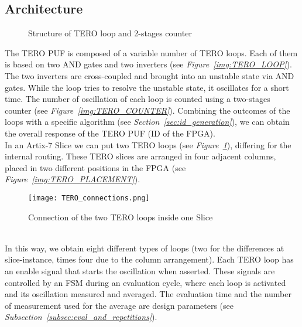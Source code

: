 \subsection{Architecture}
\begin{figure}
    \centering
    \caption{Structure of TERO loop and 2-stages counter}
\end{figure}
The TERO PUF is composed of a variable number of TERO loops. Each of them is based on
two AND gates and two inverters (see \textit{Figure~\ref{img:TERO_LOOP}}). \\
The two inverters are cross-coupled and brought into an unstable state via AND gates. 
While the loop tries to resolve the unstable state, it oscillates for a short time.
The number of oscillation of each loop is counted using a two-stages counter (see \textit{Figure~\ref{img:TERO_COUNTER}}).
Combining the outcomes of the loops with a specific algorithm (see \textit{Section~\ref{sec:id_generation}}),
we can obtain the overall response of the TERO PUF (ID of the FPGA). \\
In an Artix-7 Slice we can put two TERO loops (see \textit{Figure~\ref{img:TERO_CONNECTIONS}}), differing for the internal routing.
These TERO slices are arranged in four adjacent columns, placed in two different positions in the FPGA (see \textit{Figure~\ref{img:TERO_PLACEMENT}}).
\begin{figure}[h]
    \centering
    \texttt{[image: TERO\_connections.png]}
    \caption{Connection of the two TERO loops inside one Slice}
    \label{img:TERO_CONNECTIONS}
\end{figure} \\
In this way, we obtain eight different types of loops 
(two for the differences at slice-instance, times four due to the column arrangement).
Each TERO loop has an enable signal that starts the oscillation when asserted. 
These signals are controlled by an FSM during an evaluation cycle, where each loop is activated and its oscillation measured and averaged.
The evaluation time and the number of measurement used for the average are design parameters (see \textit{Subsection~\ref{subsec:eval_and_repetitions}}).

